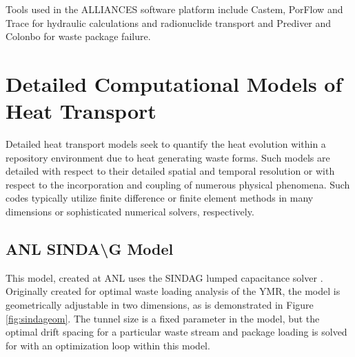 {Tools used in the ALLIANCES software platform include Castem, PorFlow and Trace
for hydraulic calculations and radionuclide transport and Prediver and Colonbo for
waste package failure.






\section{Detailed Computational Models of Heat Transport}
\label{sec:detailed_heat}


Detailed heat transport models seek to quantify the heat evolution within a 
repository environment due to heat generating waste forms. Such models are 
detailed with respect to their detailed spatial and temporal resolution or 
with respect to the incorporation and coupling of numerous physical phenomena. 
Such codes typically utilize finite difference or finite element methods in 
many dimensions or sophisticated numerical solvers, respectively. 



\subsection{ANL SINDA{\textbackslash}G Model}

This model, created at \gls{ANL} uses the \gls{SINDAG} 
lumped capacitance solver \cite{gaski_sinda_1987}. Originally created for optimal waste loading analysis 
of the \gls{YMR}, the model is geometrically adjustable in two dimensions,   
as is demonstrated in Figure \ref{fig:sindageom}. The tunnel size is a fixed 
parameter in the model, but the optimal drift spacing for a particular waste 
stream and package loading is solved for with an optimization loop within this 
model.

}
